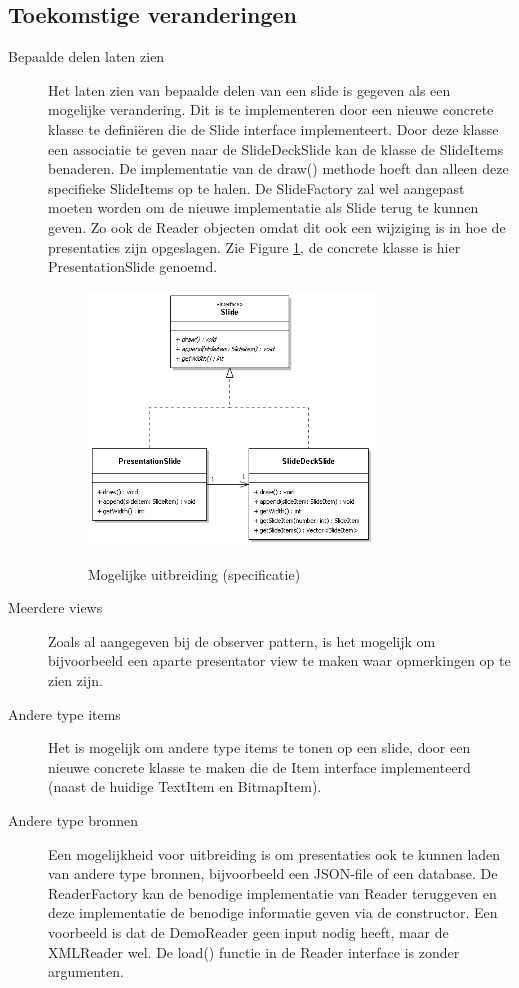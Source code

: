 \documentclass[a4paper]{article}
\begin{document}
\subsection{Toekomstige veranderingen}
\begin{description}
\item[Bepaalde delen laten zien] Het laten zien van bepaalde delen van een slide is gegeven als een mogelijke verandering. Dit is te implementeren door een nieuwe concrete klasse te definiëren die de Slide interface implementeert. Door deze klasse een associatie te geven naar de SlideDeckSlide kan de klasse de SlideItems benaderen. De implementatie van de draw() methode hoeft dan alleen deze specifieke SlideItems op te halen. De SlideFactory zal wel aangepast moeten worden om de nieuwe implementatie als Slide terug te kunnen geven. Zo ook de Reader objecten omdat dit ook een wijziging is in hoe de presentaties zijn opgeslagen. Zie Figure \ref{fig:mogelijkeuitbreiding}, de concrete klasse is hier PresentationSlide genoemd.
\begin{figure}[htbp]
\caption{Mogelijke uitbreiding (specificatie)}
\centering
\includegraphics[width=0.75\textwidth]{MogelijkeUitbreiding.PNG}
\label{fig:mogelijkeuitbreiding}
\end{figure}

\item[Meerdere views] Zoals al aangegeven bij de observer pattern, is het mogelijk om bijvoorbeeld een aparte presentator view te maken waar opmerkingen op te zien zijn.
\item[Andere type items] Het is mogelijk om andere type items te tonen op een slide, door een nieuwe concrete klasse te maken die de Item interface implementeerd (naast de huidige TextItem en BitmapItem).
\item[Andere type bronnen] Een mogelijkheid voor uitbreiding is om presentaties ook te kunnen laden van andere type bronnen, bijvoorbeeld een JSON-file of een database. De ReaderFactory kan de benodige implementatie van Reader teruggeven en deze implementatie de benodige informatie geven via de constructor. Een voorbeeld is dat de DemoReader geen input nodig heeft, maar de XMLReader wel.  De load() functie in de Reader interface is zonder argumenten.
\end{description}
\end{document}
